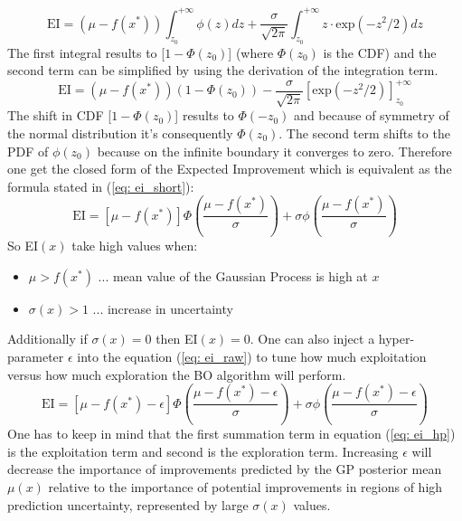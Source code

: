 \documentclass[12pt, a4paper]{article}
\begin{document}
\begin{equation}
    \text{EI} = (\mu - f(x^{\ast})) \int_{z_0}^{+ \infty} \phi(z) dz + \frac{\sigma}{\sqrt{2\pi}}\int_{z_0}^{+ \infty} z \cdot \text{exp}(-z^2/2) dz
\end{equation}
The first integral results to [$1 - \Phi(z_0)$] (where $\Phi(z_0)$ is the CDF) and the second term can be simplified by using the derivation of the integration term.
\begin{equation}
    \text{EI} = (\mu - f(x^{\ast})) (1 - \Phi(z_0)) - \frac{\sigma}{\sqrt{2\pi}} [\text{exp}(-z^2/2)]_{z_0}^{+ \infty}
\end{equation}
The shift in CDF [$1 - \Phi(z_0)$] results to $\Phi(- z_0)$ and because of symmetry of the normal distribution it's consequently $\Phi(z_0)$. The second term shifts to the PDF of $\phi(z_0)$ because on the infinite boundary it converges to zero.
Therefore one get the closed form of the Expected Improvement which is equivalent as the formula stated in (\ref{eq: ei_short}):
\begin{equation}
\label{eq: ei_raw}
    \text{EI} = [\mu - f(x^{\ast})] \Phi \left(\frac{\mu - f(x^{\ast})}{\sigma}\right) + \sigma \phi \left (\frac{\mu - f(x^{\ast})}{\sigma} \right)
\end{equation}
So EI$(x)$ take high values when:
\begin{itemize}
    \item $\mu > f(x^{\ast})$ ... mean value of the Gaussian Process is high at $x$
    \item $\sigma(x) > 1$ ... increase in uncertainty
\end{itemize}
Additionally if $\sigma(x) = 0$ then EI$(x) = 0$.
One can also inject a hyper-parameter $\epsilon$ into the equation (\ref{eq: ei_raw}) to tune how much exploitation versus how much exploration the BO algorithm will perform.
\begin{equation}
\label{eq: ei_hp}
        \text{EI} = [\mu - f(x^{\ast}) - \epsilon] \Phi\left(\frac{\mu - f(x^{\ast}) - \epsilon}{\sigma} \right) + \sigma \phi\left(\frac{\mu - f(x^{\ast}) - \epsilon}{\sigma}\right)
\end{equation}
One has to keep in mind that the first summation term in equation (\ref{eq: ei_hp}) is the exploitation term and second is the exploration term. Increasing $\epsilon$ will decrease the importance of improvements predicted by the GP posterior mean $\mu(x)$ relative to the importance of potential improvements in regions of high prediction uncertainty, represented by large $\sigma(x)$ values.
\end{document}
